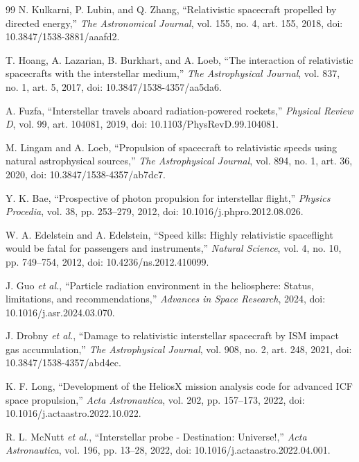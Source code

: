 \documentclass[conference]{../../../../Conference-LaTeX-template_10-17-19/IEEEtran}
\begin{document}
\begin{thebibliography}{99}
N. Kulkarni, P. Lubin, and Q. Zhang, ``Relativistic spacecraft propelled by directed energy,'' \textit{The Astronomical Journal}, vol. 155, no. 4, art. 155, 2018, doi: 10.3847/1538-3881/aaafd2.

T. Hoang, A. Lazarian, B. Burkhart, and A. Loeb, ``The interaction of relativistic spacecrafts with the interstellar medium,'' \textit{The Astrophysical Journal}, vol. 837, no. 1, art. 5, 2017, doi: 10.3847/1538-4357/aa5da6.

A. Fuzfa, ``Interstellar travels aboard radiation-powered rockets,'' \textit{Physical Review D}, vol. 99, art. 104081, 2019, doi: 10.1103/PhysRevD.99.104081.

M. Lingam and A. Loeb, ``Propulsion of spacecraft to relativistic speeds using natural astrophysical sources,'' \textit{The Astrophysical Journal}, vol. 894, no. 1, art. 36, 2020, doi: 10.3847/1538-4357/ab7dc7.

Y. K. Bae, ``Prospective of photon propulsion for interstellar flight,'' \textit{Physics Procedia}, vol. 38, pp. 253--279, 2012, doi: 10.1016/j.phpro.2012.08.026.

W. A. Edelstein and A. Edelstein, ``Speed kills: Highly relativistic spaceflight would be fatal for passengers and instruments,'' \textit{Natural Science}, vol. 4, no. 10, pp. 749--754, 2012, doi: 10.4236/ns.2012.410099.

J. Guo \textit{et al.}, ``Particle radiation environment in the heliosphere: Status, limitations, and recommendations,'' \textit{Advances in Space Research}, 2024, doi: 10.1016/j.asr.2024.03.070.

J. Drobny \textit{et al.}, ``Damage to relativistic interstellar spacecraft by ISM impact gas accumulation,'' \textit{The Astrophysical Journal}, vol. 908, no. 2, art. 248, 2021, doi: 10.3847/1538-4357/abd4ec.

K. F. Long, ``Development of the HeliosX mission analysis code for advanced ICF space propulsion,'' \textit{Acta Astronautica}, vol. 202, pp. 157--173, 2022, doi: 10.1016/j.actaastro.2022.10.022.

R. L. McNutt \textit{et al.}, ``Interstellar probe - Destination: Universe!,'' \textit{Acta Astronautica}, vol. 196, pp. 13--28, 2022, doi: 10.1016/j.actaastro.2022.04.001.


\end{thebibliography}
\end{document}

